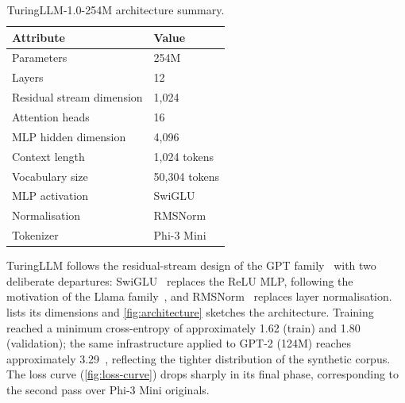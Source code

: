 \documentclass[10pt]{article}
\begin{document}
\begin{table}
\centering
\begin{tabular}{ll}
\toprule
\textbf{Attribute}         & \textbf{Value}  \\
\midrule
Parameters                 & 254M            \\
Layers                     & 12              \\
Residual stream dimension  & 1,024           \\
Attention heads            & 16              \\
MLP hidden dimension       & 4,096           \\
Context length             & 1,024 tokens    \\
Vocabulary size            & 50,304 tokens   \\
MLP activation             & SwiGLU          \\
Normalisation              & RMSNorm         \\
Tokenizer                  & Phi-3 Mini      \\
\bottomrule
\end{tabular}
\caption{TuringLLM-1.0-254M architecture summary.}
\label{tab:turinglm}
\end{table}

TuringLLM follows the residual-stream design of the GPT family~\citep{radford2019language} with two deliberate departures: SwiGLU~\citep{shazeer2020glu, ramachandran2017searching} replaces the ReLU MLP, following the motivation of the Llama family~\citep{touvron2023llama}, and RMSNorm~\citep{zhang2019root} replaces layer normalisation.
 lists its dimensions and \cref{fig:architecture} sketches the architecture.
Training reached a minimum cross-entropy of approximately 1.62 (train) and 1.80 (validation); the same infrastructure applied to GPT-2 (124M) reaches approximately 3.29~\citep{karpathy2024nanogpt}, reflecting the tighter distribution of the synthetic corpus.
The loss curve (\cref{fig:loss-curve}) drops sharply in its final phase, corresponding to the second pass over Phi-3 Mini originals.
\end{document}
